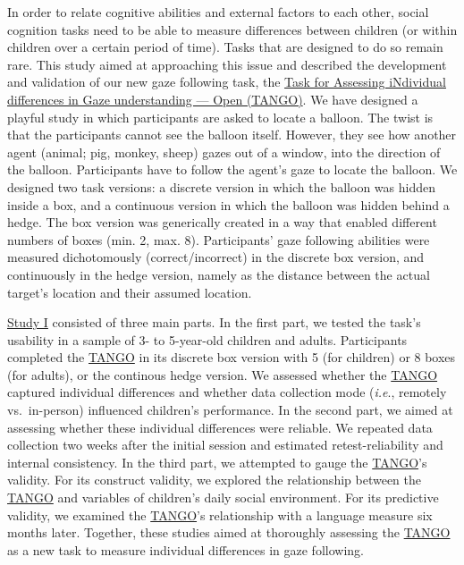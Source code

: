 \documentclass[
]{scrbook}
\begin{document}
In order to relate cognitive abilities and external factors to each other, social cognition tasks need to be able to measure differences between children (or within children over a certain period of time). Tasks that are designed to do so remain rare. This study aimed at approaching this issue and described the development and validation of our new gaze following task, the \hyperref[acronyms_TANGO]{Task for Assessing iNdividual differences in Gaze understanding --- Open (TANGO)}. We have designed a playful study in which participants are asked to locate a balloon. The twist is that the participants cannot see the balloon itself. However, they see how another agent (animal; pig, monkey, sheep) gazes out of a window, into the direction of the balloon. Participants have to follow the agent's gaze to locate the balloon. We designed two task versions: a discrete version in which the balloon was hidden inside a box, and a continuous version in which the balloon was hidden behind a hedge. The box version was generically created in a way that enabled different numbers of boxes (min. 2, max. 8). Participants' gaze following abilities were measured dichotomously (correct/incorrect) in the discrete box version, and continuously in the hedge version, namely as the distance between the actual target's location and their assumed location.

\hyperref[studyI]{Study I} consisted of three main parts. In the first part, we tested the task's usability in a sample of 3- to 5-year-old children and adults. Participants completed the \hyperref[acronyms_TANGO]{TANGO} in its discrete box version with 5 (for children) or 8 boxes (for adults), or the continous hedge version. We assessed whether the \hyperref[acronyms_TANGO]{TANGO} captured individual differences and whether data collection mode (\emph{i.e}., remotely vs.~in-person) influenced children's performance. In the second part, we aimed at assessing whether these individual differences were reliable. We repeated data collection two weeks after the initial session and estimated retest-reliability and internal consistency. In the third part, we attempted to gauge the \hyperref[acronyms_TANGO]{TANGO}'s validity. For its construct validity, we explored the relationship between the \hyperref[acronyms_TANGO]{TANGO} and variables of children's daily social environment. For its predictive validity, we examined the \hyperref[acronyms_TANGO]{TANGO}'s relationship with a language measure six months later. Together, these studies aimed at thoroughly assessing the \hyperref[acronyms_TANGO]{TANGO} as a new task to measure individual differences in gaze following.
\end{document}
